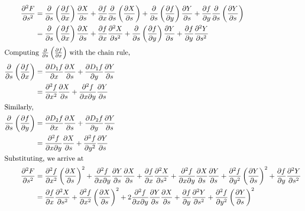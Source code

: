 \documentclass[12pt,letterpaper]{article}
\theoremstyle{definition}
\begin{document}
\begin{align*}
  \frac{\partial^2F}{\partial s^2} &= \frac{\partial}{\partial s}\left(\frac{\partial f}{\partial x}\right)\frac{\partial X}{\partial s} + \frac{\partial f}{\partial x}\frac{\partial}{\partial s}\left({\frac{\partial X}{\partial s}}\right) + \frac{\partial}{\partial s}\left(\frac{\partial f}{\partial y}\right)\frac{\partial Y}{\partial s} + \frac{\partial f}{\partial y}\frac{\partial}{\partial s}\left({\frac{\partial Y}{\partial s}}\right) \\
                                   &= \frac{\partial}{\partial s}\left(\frac{\partial f}{\partial x}\right)\frac{\partial X}{\partial s} + \frac{\partial f}{\partial x}{\frac{\partial^2 X}{\partial s^2}} + \frac{\partial}{\partial s}\left(\frac{\partial f}{\partial y}\right)\frac{\partial Y}{\partial s} + \frac{\partial f}{\partial y}\frac{\partial^2 Y}{\partial s^2} \\
  \intertext{Computing $\frac{\partial}{\partial s}\left( \frac{\partial f}{\partial x} \right)$ with the chain rule,}
  \frac{\partial}{\partial s}\left( \frac{\partial f}{\partial x} \right) &= \frac{\partial D_1f}{\partial x}\frac{\partial X}{\partial s} + \frac{\partial D_1f}{\partial y}\frac{\partial Y}{\partial s} \\
                                   &= \frac{\partial^2 f}{\partial x^2}\frac{\partial X}{\partial s} + \frac{\partial^2 f}{\partial x \partial y}\frac{\partial Y}{\partial s} \\
  \intertext{Similarly,}
  \frac{\partial}{\partial s}\left( \frac{\partial f}{\partial y} \right) &= \frac{\partial D_2f}{\partial x}\frac{\partial X}{\partial s} + \frac{\partial D_2f}{\partial y}\frac{\partial Y}{\partial s} \\
                                   &=  \frac{\partial^2 f}{\partial x \partial y}\frac{\partial X}{\partial s} + \frac{\partial^2 f}{\partial y^2}\frac{\partial Y}{\partial s}\\
  \intertext{Substituting, we arrive at}
  \frac{\partial^2F}{\partial s^2} &= \frac{\partial^2 f}{\partial x^2}\left( \frac{\partial X}{\partial s} \right)^2 + \frac{\partial^2f}{\partial x \partial y}\frac{\partial Y}{\partial s}\frac{\partial X}{\partial s} + \frac{\partial f}{\partial x}\frac{\partial^2 X}{\partial s^2} + \frac{\partial^2 f}{\partial x \partial y}\frac{\partial X}{\partial s}\frac{\partial Y}{\partial s} + \frac{\partial^2 f}{\partial y^2}\left(\frac{\partial Y}{\partial s}\right)^2 + \frac{\partial f}{\partial y}\frac{\partial^2 Y}{\partial s^2} \\
                                   &= \frac{\partial f}{\partial x}\frac{\partial^2 X}{\partial s^2} + \frac{\partial^2 f}{\partial x^2}\left( \frac{\partial X}{\partial s} \right)^2 + 2\frac{\partial^2f}{\partial x \partial y}\frac{\partial Y}{\partial s}\frac{\partial X}{\partial s} +  \frac{\partial f}{\partial y}\frac{\partial^2 Y}{\partial s^2} + \frac{\partial^2 f}{\partial y^2}\left(\frac{\partial Y}{\partial s}\right)^2
\end{align*}
\end{document}
